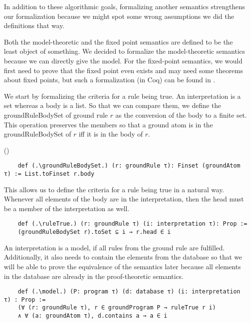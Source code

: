 In addition to these algorithmic goals, formalizing another semantics strengthens our formalization because we might spot some wrong assumptions we did the definitions that way.

Both the model-theoretic and the fixed point semantics are defined to be the least object of something. We decided to formalize the model-theoretic semantics because we can directly give the model. For the fixed-point semantics, we would first need to prove that the fixed point even exists and may need some theorems about fixed points, but such a formalization (in Coq) can be found in \cite{datalogCoq}.

We start by formalizing the criteria for a rule being true. An interpretation is a set whereas a body is a list. So that we can compare them, we define the groundRuleBodySet of ground rule $r$ as the conversion of the body to a finite set. This operation preserves the members so that a ground atom is in the groundRuleBodySet of $r$ iff it is in the body of $r$.


(\groundRuleBodySetiffgroundRuleBody)


\begin{lstlisting}
    def (.\groundRuleBodySet.) (r: groundRule τ): Finset (groundAtom τ) := List.toFinset r.body
\end{lstlisting}

This allows us to define the criteria for a rule being true in a natural way. Whenever all elements of the body are in the interpretation, then the head must be a member of the interpretation as well.

\begin{lstlisting}
    def (.\ruleTrue.) (r: groundRule τ) (i: interpretation τ): Prop := 
    (groundRuleBodySet r).toSet ⊆ i → r.head ∈ i
\end{lstlisting}

An interpretation is a model, if all rules from the ground rule are fulfilled. Additionally, it also needs to contain the elements from the database so that we will be able to prove the equivalence of the semantics later because all elements in the database are already in the proof-theoretic semantics.

\begin{lstlisting}
    def (.\model.) (P: program τ) (d: database τ) (i: interpretation τ) : Prop := 
    (∀ (r: groundRule τ), r ∈ groundProgram P → ruleTrue r i) 
    ∧ ∀ (a: groundAtom τ), d.contains a → a ∈ i
\end{lstlisting}

